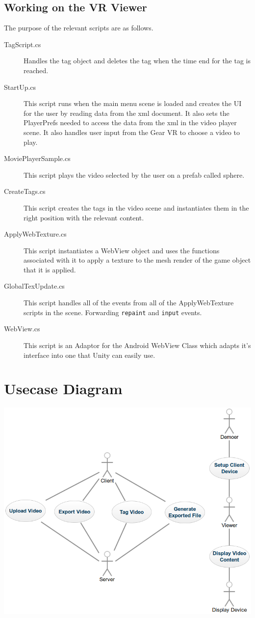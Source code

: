 \documentclass[12pt]{report}
\newcommand{\inlinecode}{\texttt}
\begin{document}
\begin{appendices}
    \section{Working on the VR Viewer}
    The purpose of the relevant scripts are as follows.
 \begin{description}
\item[TagScript.cs] Handles the tag object and deletes the tag when the time end for the tag is reached.
\item[StartUp.cs] This script runs when the main menu scene is loaded and creates the UI for the user by reading data from the xml document. It also sets the PlayerPrefs needed to access the data from the xml in the video player scene. It also handles user input from the Gear VR to choose a video to play.
\item[MoviePlayerSample.cs] This script plays the video selected by the user on a prefab called sphere.
\item[CreateTags.cs] This script creates the tags in the video scene and instantiates them in the right position with the relevant content.
\item[ApplyWebTexture.cs] This script instantiates a WebView object and uses the functions associated with it to apply a texture to the mesh render of the game object that it is applied.
\item[GlobalTexUpdate.cs] This script handles all of the events from all of the ApplyWebTexture scripts in the scene. Forwarding \inlinecode{repaint} and \inlinecode{input} events.
\item[WebView.cs] This script is an Adaptor for the Android WebView Class which adapts it's interface into one that Unity can easily use.
 \end{description}
 \chapter{Usecase Diagram}
 \includegraphics[height=\textwidth]{usecase}
\end{appendices}
\end{document}
